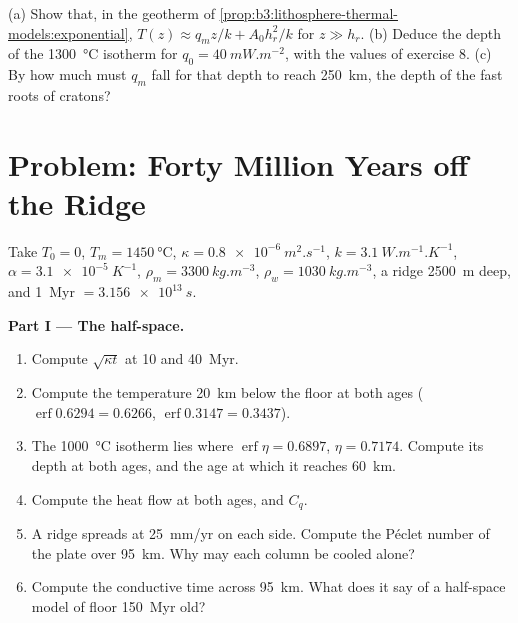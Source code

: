 \begin{exercise}[$\star\star\star$]\label{exo:b3:lithosphere-thermal-models:12}
(a) Show that, in the geotherm of \cref{prop:b3:lithosphere-thermal-models:exponential},
$T(z) \approx q_mz/k + A_0h_r^2/k$ for $z \gg h_r$. (b) Deduce the depth of the
\qty{1300}{\celsius} isotherm for $q_0 = \qty{40}{mW.m^{-2}}$, with the values
of exercise 8. (c) By how much must $q_m$ fall for that depth to reach
\qty{250}{km}, the depth of the fast roots of cratons?
\end{exercise}

\section{Problem: Forty Million Years off the Ridge}

\begin{problem}
\label{pb:b3:lithosphere-thermal-models:1}
Take $T_0 = 0$, $T_m = \qty{1450}{\celsius}$, $\kappa =
\qty{0.8e-6}{m^2.s^{-1}}$, $k = \qty{3.1}{W.m^{-1}.K^{-1}}$, $\alpha =
\qty{3.1e-5}{K^{-1}}$, $\rho_m = \qty{3300}{kg.m^{-3}}$, $\rho_w =
\qty{1030}{kg.m^{-3}}$, a ridge \qty{2500}{m} deep, and \qty{1}{Myr} $=
\qty{3.156e13}{s}$.

\medskip\noindent\textbf{Part I --- The half-space.}
\begin{enumerate}
  \item Compute $\sqrt{\kappa t}$ at 10 and \qty{40}{Myr}.
  \item Compute the temperature \qty{20}{km} below the floor at both ages
        ($\operatorname{erf}0.6294 = 0.6266$, $\operatorname{erf}0.3147 =
        0.3437$).
  \item The \qty{1000}{\celsius} isotherm lies where $\operatorname{erf}\eta =
        0.6897$, $\eta = 0.7174$. Compute its depth at both ages, and the age
        at which it reaches \qty{60}{km}.
  \item Compute the heat flow at both ages, and $C_q$.
  \item A ridge spreads at \qty{25}{mm/yr} on each side. Compute the Péclet
        number of the plate over \qty{95}{km}. Why may each column be cooled
        alone?
  \item Compute the conductive time across \qty{95}{km}. What does it say of
        a half-space model of floor \qty{150}{Myr} old?
\end{enumerate}


\end{problem}
